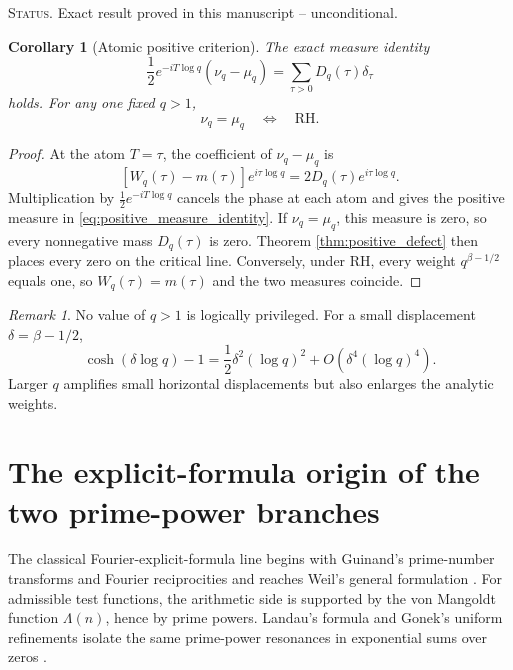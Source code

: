 \documentclass[11pt]{amsart}
\numberwithin{equation}{section}
\theoremstyle{plain}
\newtheorem{corollary}[theorem]{Corollary}
\theoremstyle{definition}
\theoremstyle{remark}
\newtheorem{remark}[theorem]{Remark}
\newcommand{\RH}{\mathrm{RH}}
\newcommand{\1}{\mathbf{1}}
\newcommand{\statusnote}[1]{%
  \par\smallskip\noindent
  \begingroup\footnotesize\textsc{Status.} #1\endgroup
  \par\smallskip}
\begin{document}
\statusnote{Exact result proved in this manuscript -- unconditional.}
\begin{corollary}[Atomic positive criterion]
\label{cor:atomic_positive_criterion}
The exact measure identity
\begin{equation}
\boxed{
\frac12e^{-iT\log q}(\nu_q-\mu_q)
=
\sum_{\tau>0}D_q(\tau)\delta_\tau
}
\label{eq:positive_measure_identity}
\end{equation}
holds.  For any one fixed \(q>1\),
\begin{equation}
\nu_q=\mu_q
\quad\Longleftrightarrow\quad
\RH.
\label{eq:measure_RH_equivalence}
\end{equation}
\end{corollary}

\begin{proof}
At the atom \(T=\tau\), the coefficient of \(\nu_q-\mu_q\) is
\begin{equation}
\left[W_q(\tau)-m(\tau)\right]e^{i\tau\log q}
=
2D_q(\tau)e^{i\tau\log q}.
\label{eq:atomic_difference_coefficient}
\end{equation}
Multiplication by \(\frac12e^{-iT\log q}\) cancels the phase at each
atom and gives the positive measure in
\eqref{eq:positive_measure_identity}.  If \(\nu_q=\mu_q\), this measure
is zero, so every nonnegative mass \(D_q(\tau)\) is zero.  Theorem
\ref{thm:positive_defect} then places every zero on the critical line.
Conversely, under \(\RH\), every weight \(q^{\beta-1/2}\) equals one, so
\(W_q(\tau)=m(\tau)\) and the two measures coincide.
\end{proof}

\begin{remark}
\label{rem:q_sensitivity}
No value of \(q>1\) is logically privileged.  For a small displacement
\(\delta=\beta-1/2\),
\begin{equation}
\cosh(\delta\log q)-1
=
\frac12\delta^2(\log q)^2
+
O\left(\delta^4(\log q)^4\right).
\label{eq:q_sensitivity}
\end{equation}
Larger \(q\) amplifies small horizontal displacements but also enlarges
the analytic weights.
\end{remark}

\section{The explicit-formula origin of the two prime-power branches}
\label{sec:explicit_formula_branches}

The classical Fourier-explicit-formula line begins with Guinand's prime-number transforms and Fourier reciprocities and reaches Weil's general formulation \cite{Guinand1947,Guinand1949,Guinand1948,Weil1952}.  For admissible test functions, the arithmetic side is supported by the von Mangoldt function \(\Lambda(n)\), hence by prime powers.
Landau's formula and Gonek's uniform refinements isolate the same
prime-power resonances in exponential sums over zeros
\cite{Gonek1985,FordZaharescu2005,FordSoundararajanZaharescu2009}.
\end{document}
